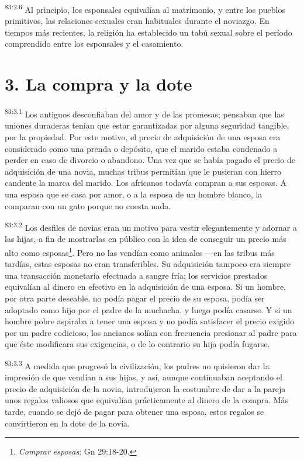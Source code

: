 \par
\textsuperscript{83:2.6} Al principio, los esponsales equivalían al matrimonio, y entre los pueblos primitivos, las relaciones sexuales eran habituales durante el noviazgo. En tiempos más recientes, la religión ha establecido un tabú sexual sobre el período comprendido entre los esponsales y el casamiento.

\section*{3. La compra y la dote}
\par
\textsuperscript{83:3.1} Los antiguos desconfiaban del amor y de las promesas; pensaban que las uniones duraderas tenían que estar garantizadas por alguna seguridad tangible, por la propiedad. Por este motivo, el precio de adquisición de una esposa era considerado como una prenda o depósito, que el marido estaba condenado a perder en caso de divorcio o abandono. Una vez que se había pagado el precio de adquisición de una novia, muchas tribus permitían que le pusieran con hierro candente la marca del marido. Los africanos todavía compran a sus esposas. A una esposa que se casa por amor, o a la esposa de un hombre blanco, la comparan con un gato porque no cuesta nada.

\par
\textsuperscript{83:3.2} Los desfiles de novias eran un motivo para vestir elegantemente y adornar a las hijas, a fin de mostrarlas en público con la idea de conseguir un precio más alto como esposas\footnote{\textit{Comprar esposas}: Gn 29:18-20.}. Pero no las vendían como animales ---en las tribus más tardías, estas esposas no eran transferibles. Su adquisición tampoco era siempre una transacción monetaria efectuada a sangre fría; los servicios prestados equivalían al dinero en efectivo en la adquisición de una esposa. Si un hombre, por otra parte deseable, no podía pagar el precio de su esposa, podía ser adoptado como hijo por el padre de la muchacha, y luego podía casarse. Y si un hombre pobre aspiraba a tener una esposa y no podía satisfacer el precio exigido por un padre codicioso, los ancianos solían con frecuencia presionar al padre para que éste modificara sus exigencias, o de lo contrario su hija podía fugarse.

\par
\textsuperscript{83:3.3} A medida que progresó la civilización, los padres no quisieron dar la impresión de que vendían a sus hijas, y así, aunque continuaban aceptando el precio de adquisición de la novia, introdujeron la costumbre de dar a la pareja unos regalos valiosos que equivalían prácticamente al dinero de la compra. Más tarde, cuando se dejó de pagar para obtener una esposa, estos regalos se convirtieron en la dote de la novia.

